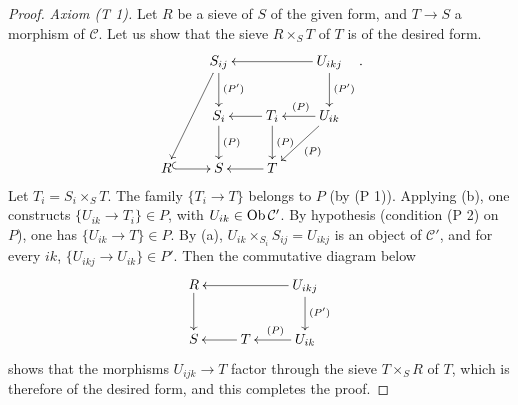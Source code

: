 \begin{proof}
\emph{Axiom (T 1).} Let \(R\) be a sieve
of \(S\) of the given form, and \(T\to S\)
a morphism of \(\mathcal C\).
Let us show that the sieve \(R\times_S T\)
of \(T\) is of the desired form.
\[
\xymatrix@C=2.1em{
 & S_{ij}\ar[d]^{(P')}\ar[ddl] & & U_{ikj}\ar[ll]\ar[d]^{(P')}\\
 & S_i\ar[d]^{(P)} & T_i\ar[l]\ar[d]^{(P)}
 & U_{ik}\ar[l]_{(P)}\ar[dl]^{(P)}\\
R\ar@{^{(}->}[r] & S & T\ar[l] & }.
\]
Let \(T_i=S_i\times_S T\).
The family \(\{T_i\to T\}\) belongs to \(P\)
(by (P 1)). Applying (b), one constructs
\(\{U_{ik}\to T_i\}\in P\), with
\(U_{ik}\in\operatorname{Ob}\mathcal C'\).
By hypothesis (condition (P 2) on \(P\)),
one has \(\{U_{ik}\to T\}\in P\).
By (a), \(U_{ik}\times_{S_i}S_{ij}=U_{ikj}\)
is an object of \(\mathcal C'\), and for
every \(ik\), \(\{U_{ikj}\to U_{ik}\}\in P'\).
Then the commutative diagram below
\[
\xymatrix{
R\ar[d] & & U_{ikj}\ar[ll]\ar[d]^{(P')}\\
S & T\ar[l] & U_{ik}\ar[l]_{(P)} }
\]
shows that the morphisms \(U_{ijk}\to T\)
factor through the sieve \(T\times_S R\)
of \(T\), which is therefore of the desired form,
and this completes the proof.
\end{proof}

